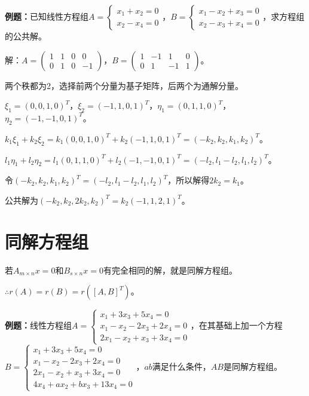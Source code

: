\documentclass[UTF8, 12pt]{ctexart}
\begin{document}
\textbf{例题：}已知线性方程组$A=\left\{\begin{array}{l}
    x_1+x_2=0 \\
    x_2-x_4=0
\end{array}\right.$，$B=\left\{\begin{array}{l}
    x_1-x_2+x_3=0 \\
    x_2-x_3+x_4=0
\end{array}\right.$，求方程组的公共解。

解：$A=\left(\begin{array}{cccc}
    1 & 1 & 0 & 0 \\
    0 & 1 & 0 & -1
\end{array}\right)$，$B=\left(\begin{array}{cccc}
    1 & -1 & 1 & 0 \\
    0 & 1 & -1 & 1
\end{array}\right)$。\medskip

两个秩都为2，选择前两个分量为基子矩阵，后两个为通解分量。

$\xi_1=(0,0,1,0)^T$，$\xi_2=(-1,1,0,1)^T$，$\eta_1=(0,1,1,0)^T$，$\eta_2=(-1,-1,0,1)^T$。

$k_1\xi_1+k_2\xi_2=k_1(0,0,1,0)^T+k_2(-1,1,0,1)^T=(-k_2,k_2,k_1,k_2)^T$。

$l_1\eta_1+l_2\eta_2=l_1(0,1,1,0)^T+l_2(-1,-1,0,1)^T=(-l_2,l_1-l_2,l_1,l_2)^T$。

令$(-k_2,k_2,k_1,k_2)^T=(-l_2,l_1-l_2,l_1,l_2)^T$，所以解得$2k_2=k_1$。

公共解为$(-k_2,k_2,2k_2,k_2)^T=k_2(-1,1,2,1)^T$。

\section{同解方程组}

若$A_{m\times n}x=0$和$B_{s\times n}x=0$有完全相同的解，就是同解方程组。

$\therefore r(A)=r(B)=r([A,B]^T)$。

\textbf{例题：}线性方程组$A=\left\{\begin{array}{l}
    x_1+3x_3+5x_4=0 \\
    x_1-x_2-2x_3+2x_4=0 \\
    2x_1-x_2+x_3+3x_4=0
\end{array}\right.$，在其基础上加一个方程$B=\left\{\begin{array}{l}
    x_1+3x_3+5x_4=0 \\
    x_1-x_2-2x_3+2x_4=0 \\
    2x_1-x_2+x_3+3x_4=0 \\
    4x_4+ax_2+bx_3+13x_4=0
\end{array}\right.$，$ab$满足什么条件，$AB$是同解方程组。
\end{document}
